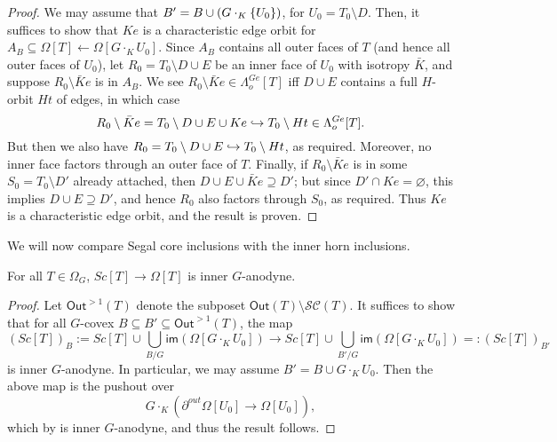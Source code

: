 \documentclass[a4paper,10pt,draft]{article}%
\numberwithin{equation}{section}%
\begin{document}
\begin{proof}
      We may assume that $B' = B \cup (G\cdot_K \left\{U_0\right\})$, for $U_0 = T_0 \setminus D$.
      Then, it suffices to show that $K e$ is a characteristic edge orbit for
      $A_B \subseteq \Omega[T] \leftarrow \Omega[G \cdot_K U_0]$.
      Since $A_B$ contains all outer faces of $T$ (and hence all outer faces of $U_0$),
      let $R_0 = T_0 \setminus D \cup E$ be an inner face of $U_0$ with isotropy $\bar K$, and suppose
      $R_0 \setminus \bar K e$ is in $A_B$.
      We see $R_0 \setminus \bar K e \in \Lambda^{G e}_o[T]$ iff $D \cup E$ contains a full $H$-orbit $H t$ of edges, in which case
      \begin{equation}
            R_0 \setminus \bar K e = T_0 \setminus D \cup E \cup K e
            \hookrightarrow
            T_0 \setminus H t \in \Lambda^{G e}_o[T].
      \end{equation}
      But then we also have $R_0 = T_0 \setminus D \cup E \hookrightarrow T_0 \setminus H t$, as required.
      Moreover, no inner face factors through an outer face of $T$.
      Finally, if $R_0 \setminus \bar K e$ is in some $S_0 = T_0 \setminus D'$ already attached, then
      $D \cup E \cup \bar K e \supseteq D'$;
      but since $D' \cap K e = \varnothing$, this implies
      $D \cup E \supseteq D'$, and hence $R_0$ also factors through $S_0$, as required.
      Thus $K e$ is a characteristic edge orbit, and the result is proven.
\end{proof}



We will now compare Segal core inclusions with the inner horn inclusions.

\begin{proposition}
      \label{SC_IN_GHORN_PROP}
      For all $T \in \Omega_G$, $Sc[T] \to \Omega[T]$ is inner $G$-anodyne.
\end{proposition}
\begin{proof}
      Let $\mathsf{Out}^{>1}(T)$ denote the subposet $\mathsf{Out}(T) \setminus \mathscr{SC}(T)$. 
      It suffices to show that for all $G$-covex $B \subseteq B' \subseteq \mathsf{Out}^{>1}(T)$, the map
      \begin{equation}
            (Sc[T])_B :=
            Sc[T] \cup \mathop{\bigcup}\limits_{B/G}\mathsf{im}(\Omega[G \cdot_K U_0])
            \to
            Sc[T] \cup \mathop{\bigcup}\limits_{B'/G}\mathsf{im}(\Omega[G \cdot_K U_0])
            =: (Sc[T])_{B'}
      \end{equation}
      is inner $G$-anodyne. In particular, we may assume $B' = B \cup G \cdot_K U_0$.
      Then the above map is the pushout over
      \begin{equation}
                  G\cdot_K \left(\partial^{out}\Omega[U_0] \to \Omega[U_0] \right),
      \end{equation}
      which by \cite[Proposition 6.17]{Per17} is inner $G$-anodyne,
      and thus the result follows.
\end{proof}
\end{document}
